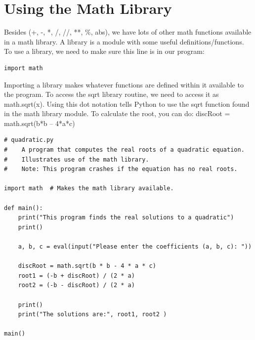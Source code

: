 \documentclass[12pt,a4paper,final,twoside,titlepage]{book}
\begin{document}
\section{Using the Math Library}
Besides (+, -, *, /, //, **, \%, abs), we have lots of other math functions available in a math library. A library is a module with some useful definitions/functions.  To use a library, we need to make sure this line is in our program:
\lstset{language=Python, tabsize=4}
\begin{lstlisting}
import math
\end{lstlisting}
Importing a library makes whatever functions are defined within it available to the program. To access the sqrt library routine, we need to access it as math.sqrt(x). Using this dot notation tells Python to use the sqrt function found in the math library module.
To calculate the root, you can do:
discRoot = math.sqrt(b*b – 4*a*c)
\lstset{language=Python, tabsize=4}
\begin{lstlisting}
# quadratic.py
#    A program that computes the real roots of a quadratic equation.
#    Illustrates use of the math library.
#    Note: This program crashes if the equation has no real roots.

import math  # Makes the math library available.

def main():
    print("This program finds the real solutions to a quadratic")
    print()

    a, b, c = eval(input("Please enter the coefficients (a, b, c): "))

    discRoot = math.sqrt(b * b - 4 * a * c)
    root1 = (-b + discRoot) / (2 * a)
    root2 = (-b - discRoot) / (2 * a)

    print()
    print("The solutions are:", root1, root2 )

main()
\end{lstlisting}
\end{document}

